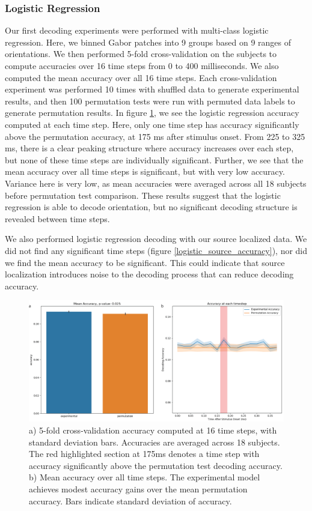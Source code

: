 \documentclass[../main.tex]{subfiles}
\begin{document}
\subsubsection{Logistic Regression}
Our first decoding experiments were performed with multi-class logistic regression. Here, we binned Gabor patches into 9 groups based on 9 ranges of orientations. We then performed 5-fold cross-validation on the subjects to compute accuracies over 16 time steps from 0 to 400 milliseconds. We also computed the mean accuracy over all 16 time steps. Each cross-validation experiment was performed 10 times with shuffled data to generate experimental results, and then 100 permutation tests were run with permuted data labels to generate permutation results. In figure \ref{logistic_sensor_accuracy}, we see the logistic regression accuracy computed at each time step. Here, only one time step has accuracy significantly above the permutation accuracy, at 175 ms after stimulus onset. From 225 to 325 ms, there is a clear peaking structure where accuracy increases over each step, but none of these time steps are individually significant. Further, we see that the mean accuracy over all time steps is significant, but with very low accuracy. Variance here is very low, as mean accuracies were averaged across all 18 subjects before permutation test comparison. These results suggest that the logistic regression is able to decode orientation, but no significant decoding structure is revealed between time steps. 

We also performed logistic regression decoding with our source localized data. We did not find any significant time steps (figure \ref{logistic_source_accuracy}), nor did we find the mean accuracy to be significant. This could indicate that source localization introduces noise to the decoding process that can reduce decoding accuracy.


\begin{figure}
    \centering
    \includegraphics[scale=0.7]{figures/results/logistic_sensor_accuracy.png}
    \caption{a) 5-fold cross-validation accuracy computed at 16 time steps, with standard deviation bars. Accuracies are averaged across 18 subjects. The red highlighted section at 175ms denotes a time step with accuracy significantly above the permutation test decoding accuracy. b) Mean accuracy over all time steps. The experimental model achieves modest accuracy gains over the mean permutation accuracy. Bars indicate standard deviation of accuracy.}
    \label{logistic_sensor_accuracy}
\end{figure}
\end{document}
